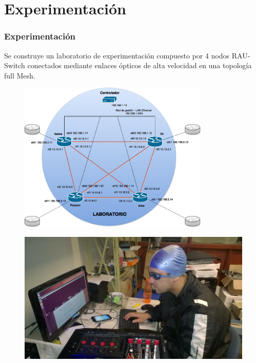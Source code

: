 \documentclass{beamer}
\begin{document}
\section{Experimentaci\'on} 
\frame{\tableofcontents[currentsection]}

\begin{frame}
\frametitle{Experimentaci\'on} 

Se construye un laboratorio de experimentaci\'on compuesto por 4 nodos RAU-Switch conectados mediante enlaces \'opticos de alta velocidad en una topolog\'ia full Mesh.

\vspace{0.5cm}
\begin{minipage}{0.60\textwidth}
\begin{figure}[htbp]
\centering
\includegraphics[width=0.81\textwidth]{imagenes/Topologia.png}
\end{figure}
\end{minipage}
\hfill
\begin{minipage}{0.35\textwidth}
\begin{figure}[H]
\centering
\includegraphics[width=1.0\textwidth]{imagenes/laboratorio.jpg}
\end{figure}
\end{minipage} 

\end{frame}
\end{document}

